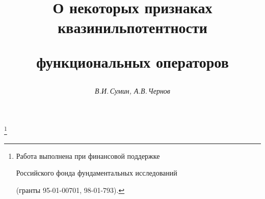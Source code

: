 




%





\newcommand{\weak}{\text{сл}}




\newcommand{\tts}[1]{}







\setcounter{page}{77}















\author{\it В.И.\,Сумин, А.В.\,Чернов}




\title{О некоторых признаках квазинильпотентности


функциональных операторов}


\thanks{Работа выполнена при финансовой поддержке


Российского фонда фундаментальных исследований


(гранты 95-01-00701, 98-01-793).}


\date{}







\pagestyle{plain} %





